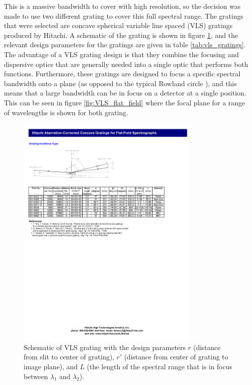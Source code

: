 This is a massive bandwidth to cover with high resolution, so the decision was made to use two different grating to cover this full spectral range.  The gratings that were selected are concave spherical variable line spaced (VLS) gratings produced by Hitachi.  A schematic of the grating is shown in figure \ref{fig:Hitachi_gratings}, and the relevant design parameters for the gratings are given in table \ref{tab:vls_gratings}.  The advantage of a VLS grating design is that they combine the focusing and dispersive optics that are generally needed into a single optic that performs both functions.  Furthermore, these gratings are designed to focus a specific spectral bandwidth onto a plane (as opposed to the typical Rowland circle \cite{pedrottiIntroductionOptics2007}), and this means that a large bandwidth can be in focus on a detector at a single position.  This can be seen in figure \ref{fig:VLS_flat_field} where the focal plane for a range of wavelengths is shown for both grating. 

\begin{figure}
	\centering
	\includegraphics[width=0.8\textwidth]{figures/Beamline/Hitachi.pdf}
	\caption[Schematic of VLS grating]{Schematic of VLS grating with the design parameters $r$ (distance from slit to center of grating), $r'$ (distance from center of grating to image plane), and $L$ (the length of the spectral range that is in focus between $\lambda_1$ and $\lambda_2$).}
	\label{fig:Hitachi_gratings}
\end{figure}


